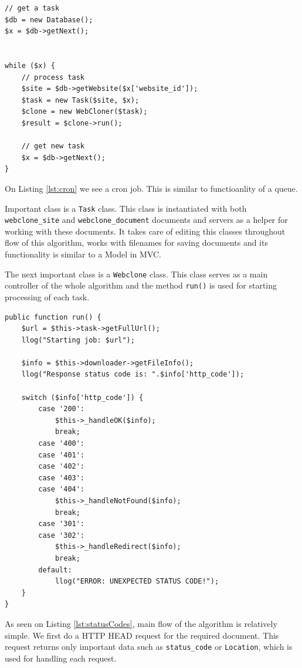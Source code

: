 \begin{lstlisting}[caption={Code executed for each document in cron},label={lst:cron}]
// get a task
$db = new Database();
$x = $db->getNext();


while ($x) {
    // process task
    $site = $db->getWebsite($x['website_id']);
    $task = new Task($site, $x);
    $clone = new WebCloner($task);
    $result = $clone->run();

    // get new task
    $x = $db->getNext();
}
\end{lstlisting}

On Listing \ref{lst:cron} we see a cron job. This is similar to functioanlity of a queue. 

Important class is a \texttt{Task} class. This class is instantiated with both \texttt{webclone\_site} and \texttt{webclone\_document} documents and servers as a helper for working with these documents. It takes care of editing this classes throughout flow of this algorithm, works with filenames for saving documents and its functionality is similar to a Model in MVC.

The next important class is a \texttt{Webclone} class. This class serves as a main controller of the whole algorithm and the method \texttt{run()} is used for starting processing of each task.

\begin{lstlisting}[caption={Handling of status codes returned by a server},label={lst:statusCodes}]
public function run() {
    $url = $this->task->getFullUrl();
    llog("Starting job: $url");

    $info = $this->downloader->getFileInfo();
    llog("Response status code is: ".$info['http_code']);

    switch ($info['http_code']) {
        case '200':
            $this->_handleOK($info);
            break;
        case '400':
        case '401':
        case '402':
        case '403':
        case '404':
            $this->_handleNotFound($info);
            break;
        case '301':
        case '302':
            $this->_handleRedirect($info);
            break;
        default:
            llog("ERROR: UNEXPECTED STATUS CODE!");
    }
}
\end{lstlisting}

As seen on Listing \ref{lst:statusCodes}, main flow of the algorithm is relatively simple. We first do a HTTP HEAD request for the required document. This request returns only important data such as \texttt{status\_code} or \texttt{Location}, which is used for handling each request. 

